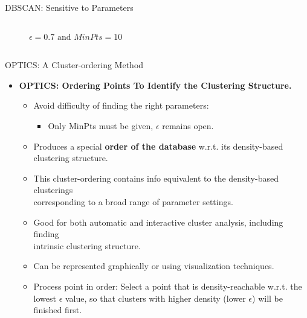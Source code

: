 \begin{frame}{DBSCAN: Sensitive to Parameters}
\begin{columns}[c]
\begin{column}{0.5\textwidth}
\begin{figure}
				\textbf{\small $\epsilon = 0.7 \text{ and } MinPts=10$}
			\end{figure}
		\end{column}
	\end{columns}
\end{frame}

\begin{frame}{OPTICS: A Cluster-ordering Method}
	\begin{itemize}
		\item \textbf{OPTICS: Ordering Points To Identify the Clustering
			      Structure.}
		      \begin{itemize}
			      \item Avoid difficulty of finding the right parameters:
			            \begin{itemize}
				            \item Only MinPts must be given, $\epsilon$ remains open.
			            \end{itemize}
			      \item Produces a special \textbf{order of the database} w.r.t. its
			            density-based clustering structure.
			      \item This cluster-ordering contains info equivalent to the
			            density-based clusterings \\ corresponding to a broad range of
			            parameter settings.
			      \item Good for both automatic and interactive cluster analysis,
			            including finding \\
			            intrinsic clustering structure.
			      \item Can be represented graphically or using visualization
			            techniques.
			      \item Process point in order: Select a point that is
			            density-reachable w.r.t. the lowest $\epsilon$ value, so that
			            clusters with higher density (lower $\epsilon$) will be finished
			            first.
		      \end{itemize}
	\end{itemize}
\end{frame}

